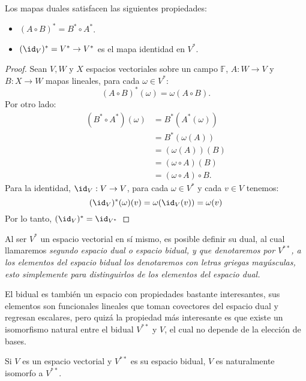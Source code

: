 \begin{lemma}
	Los mapas duales satisfacen las siguientes propiedades:
	\begin{itemize}
		\item $(A \circ B)^{*} = B^{*} \circ A^{*}$.
		\item $(\id_V)^{*} = V^{*} \to V^{*}$ es el mapa identidad en $V^{*}$.
	\end{itemize}
\end{lemma}

\begin{proof}
	Sean $V,W$ y $X$ espacios vectoriales sobre un campo $\mathbb{F}$, $A: W \to V$ y $B: X \to W$ mapas lineales, para cada $\omega \in V^{*}$:
	\[ (A\circ B)^{*}(\omega) = \omega(A \circ B). \]
	Por otro lado:
	\begin{align*}
		(B^* \circ A^*)(\omega) & = B^{*}(A^*(\omega))        \\
		                        & = B^{*}(\omega(A))          \\
		                        & = (\omega(A))(B)            \\
		                        & = (\omega \circ A) (B)      \\
		                        & = (\omega \circ A) \circ B.
	\end{align*}
	Para la identidad, $\id_V: V \to V$, para cada $\omega \in V^{*}$ y cada $v \in V$ tenemos:
	\[
		(\id_V)^{*}(\omega)(v) = \omega(\id_V(v)) = \omega(v)
	\]
	Por lo tanto, $(\id_V)^{*} = \id_{V^{*}}$
\end{proof}

Al ser $V^{*}$ un espacio vectorial en sí mismo, es posible definir su dual, al cual llamaremos \it{segundo espacio dual} o \it{espacio bidual}, y que denotaremos por $V^{**}$, a los elementos del espacio bidual los denotaremos con letras griegas mayúsculas, esto simplemente para distinguirlos de los elementos del espacio dual.

El bidual es también un espacio con propiedades bastante interesantes, sus elementos son funcionales lineales que toman covectores del espacio dual y regresan escalares, pero quizá la propiedad más interesante es que existe un isomorfismo natural entre el bidual $V^{**}$ y $V$, el cual no depende de la elección de bases.

\begin{theorem}
	Si $V$ es un espacio vectorial y $V^{**}$ es su espacio bidual, $V$ es naturalmente isomorfo a $V^{**}$.
\end{theorem}

